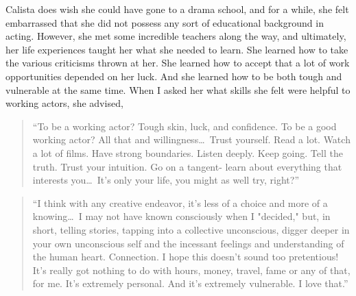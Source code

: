 \begin{multicols}{2}
	Calista does wish she could have gone to a drama school, and for a while, she felt embarrassed that she did not possess any sort of educational background in acting. However, she met some incredible teachers along the way, and ultimately, her life experiences taught her what she needed to learn. She learned how to take the various criticisms thrown at her. She learned how to accept that a lot of work opportunities depended on her luck. And she learned how to be both tough and vulnerable at the same time. When I asked her what skills she felt were helpful to working actors, she advised,
	\begin{quote}
		“To be a working actor? Tough skin, luck, and confidence. To be a good working actor? All that and willingness\ldots\ Trust yourself. Read a lot. Watch a lot of films. Have strong boundaries. Listen deeply. Keep going. Tell the truth. Trust your intuition. Go on a tangent- learn about everything that interests you\ldots\ It's only your life, you might as well try, right?”
	\end{quote}
	\begin{quote}
		“I think with any creative endeavor, it's less of a choice and more of a knowing\ldots\ I may not have known consciously when I "decided," but, in short, telling stories, tapping into a collective unconscious, digger deeper in your own unconscious self and the incessant feelings and understanding of the human heart. Connection. I hope this doesn't sound too pretentious! It's really got nothing to do with hours, money, travel, fame or any of that, for me. It's extremely personal. And it's extremely vulnerable. I love that.”
	\end{quote}


\end{multicols}
